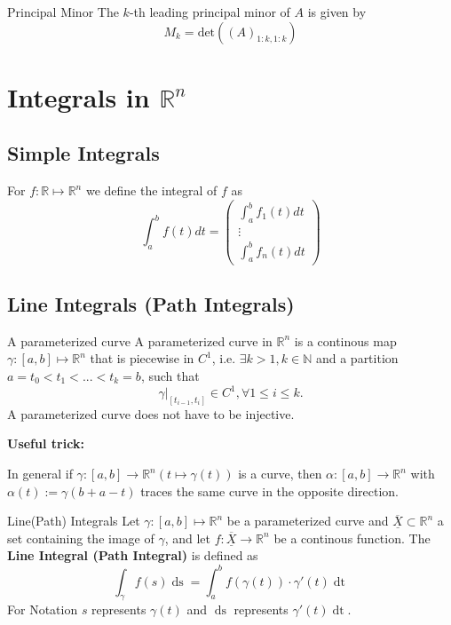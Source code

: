 \documentclass[a4paper,fontsize = 8pt]{scrartcl}
\def\R{\mathbb{R}}
\def\N{\mathbb{N}}
\def\X{\underline{\overline{X}}}
\begin{document}
\begin{subbox}{Principal Minor}
    The $k$-th leading principal minor of $A$ is given by 
    \[M_k = \text{det}\left((A)_{1:k,1:k}\right)\]
\end{subbox}


\section{Integrals in \texorpdfstring{\(\R^n\)}{Rⁿ}}
\subsection{Simple Integrals}
For \(f: \R \mapsto \R^n\) we define the integral of $f$ as
\[\int_a^b f(t)dt = 
\begin{pmatrix*}
  \int_a^b f_1(t) dt \\
  \vdots\\
  \int_a^b f_n(t) dt
\end{pmatrix*}
\]

\subsection{Line Integrals (Path Integrals)}
\begin{mainbox}{A parameterized curve}
    A parameterized curve in \(\R^n\) is a continous map \(\gamma: \left[a,b\right] \mapsto \R^n\) that is piecewise in \(C^1\), 
    i.e. \(\exists k > 1, k \in \N\) and a partition \(a = t_0 < t_1 < ... < t_k = b\), such that 
    \[\gamma|_{[t_{i-1}, t_i]} \in C^1, \forall 1 \leq i \leq k.\] 
    A parameterized curve does not have to be injective.
  \end{mainbox}
  \textbf{Useful trick:}

  In general if $\gamma: [a, b] \to \R^n (t \mapsto \gamma(t))$ is a curve, then $\alpha: [a,b] \to \R^n$ with $\alpha(t) := \gamma(b+a - t)$ traces the same curve in the opposite direction. 
  
\begin{mainbox}{Line(Path) Integrals}
    Let \(\gamma : \left[a,b\right] \mapsto \R^n\) be a parameterized curve and \(\X \subset \R^n\) a set containing the image of $\gamma$, and let $f: \X \to \R^n$ be a continous function. The \textbf{Line Integral (Path Integral)} is defined as 
    \[\int_\gamma f(s) \mathop{ds} = \int_a^b f(\gamma(t)) \cdot \gamma'(t) \mathop{dt}\]
    For Notation $s$ represents $\gamma(t)$ and $\mathop{ds}$ represents $\gamma'(t)\mathop{dt}$.
\end{mainbox}
\end{document}
